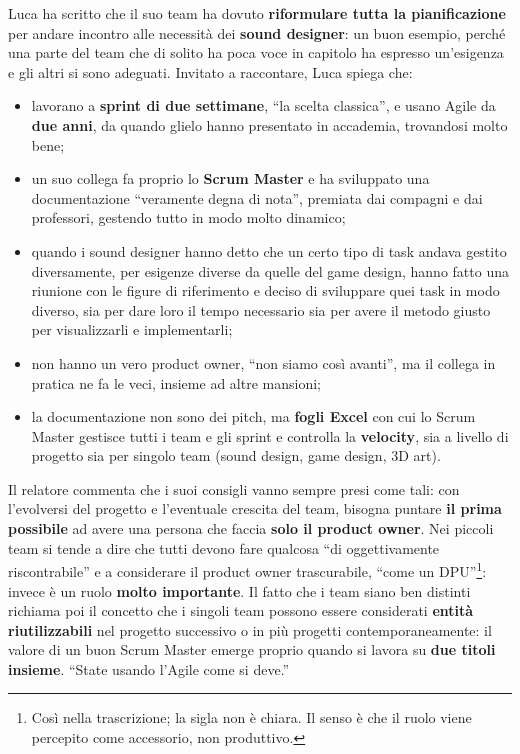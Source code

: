 Luca ha scritto che il suo team ha dovuto \textbf{riformulare tutta la
pianificazione} per andare incontro alle necessità dei \textbf{sound designer}:
un buon esempio, perché una parte del team che di solito ha poca voce in
capitolo ha espresso un'esigenza e gli altri si sono adeguati. Invitato a
raccontare, Luca spiega che:
\begin{itemize}
  \item lavorano a \textbf{sprint di due settimane}, ``la scelta classica'', e
        usano Agile da \textbf{due anni}, da quando glielo hanno presentato in
        accademia, trovandosi molto bene;
  \item un suo collega fa proprio lo \textbf{Scrum Master} e ha sviluppato una
        documentazione ``veramente degna di nota'', premiata dai compagni e dai
        professori, gestendo tutto in modo molto dinamico;
  \item quando i sound designer hanno detto che un certo tipo di task andava
        gestito diversamente, per esigenze diverse da quelle del game design,
        hanno fatto una riunione con le figure di riferimento e deciso di
        sviluppare quei task in modo diverso, sia per dare loro il tempo
        necessario sia per avere il metodo giusto per visualizzarli e
        implementarli;
  \item non hanno un vero product owner, ``non siamo così avanti'', ma il
        collega in pratica ne fa le veci, insieme ad altre mansioni;
  \item la documentazione non sono dei pitch, ma \textbf{fogli Excel} con cui lo
        Scrum Master gestisce tutti i team e gli sprint e controlla la
        \textbf{velocity}, sia a livello di progetto sia per singolo team (sound
        design, game design, 3D art).
\end{itemize}
Il relatore commenta che i suoi consigli vanno sempre presi come tali: con
l'evolversi del progetto e l'eventuale crescita del team, bisogna puntare
\textbf{il prima possibile} ad avere una persona che faccia \textbf{solo il
product owner}. Nei piccoli team si tende a dire che tutti devono fare qualcosa
``di oggettivamente riscontrabile'' e a considerare il product owner
trascurabile, ``come un DPU''\footnote{Così nella trascrizione; la sigla non è
chiara. Il senso è che il ruolo viene percepito come accessorio, non
produttivo.}: invece è un ruolo \textbf{molto importante}. Il fatto che i team
siano ben distinti richiama poi il concetto che i singoli team possono essere
considerati \textbf{entità riutilizzabili} nel progetto successivo o in più
progetti contemporaneamente: il valore di un buon Scrum Master emerge proprio
quando si lavora su \textbf{due titoli insieme}. ``State usando l'Agile come si
deve.''


